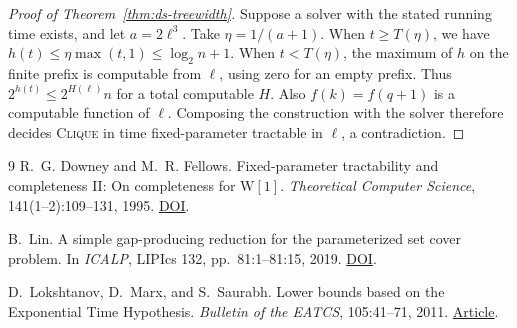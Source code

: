 \documentclass[11pt]{article}
\begin{document}
\begin{proof}[Proof of Theorem~\ref{thm:ds-treewidth}]
Suppose a solver with the stated running time exists, and let
\(a=2\ell^3\). Take \(\eta=1/(a+1)\). When \(t\ge T(\eta)\), we have
\(h(t)\le \eta\max(t,1)\le \log_2 n+1\). When \(t<T(\eta)\), the maximum
of \(h\) on the finite prefix is computable from \(\ell\), using zero for
an empty prefix. Thus \(2^{h(t)}\le 2^{H(\ell)}n\) for a total computable
\(H\). Also \(f(k)=f(q+1)\) is a computable function of \(\ell\). Composing
the construction with the solver therefore decides \textsc{Clique} in
time fixed-parameter tractable in \(\ell\), a contradiction.
\end{proof}

\begin{thebibliography}{9}
R.~G. Downey and M.~R. Fellows.
Fixed-parameter tractability and completeness II: On completeness for \(\mathrm{W}[1]\).
\emph{Theoretical Computer Science}, 141(1--2):109--131, 1995.
\href{https://doi.org/10.1016/0304-3975(94)00097-3}{DOI}.

B.~Lin.
A simple gap-producing reduction for the parameterized set cover problem.
In \emph{ICALP}, LIPIcs 132, pp.~81:1--81:15, 2019.
\href{https://doi.org/10.4230/LIPIcs.ICALP.2019.81}{DOI}.

D.~Lokshtanov, D.~Marx, and S.~Saurabh.
Lower bounds based on the Exponential Time Hypothesis.
\emph{Bulletin of the EATCS}, 105:41--71, 2011.
\href{https://bulletin.eatcs.org/index.php/beatcs/article/view/92}{Article}.
\end{thebibliography}
\end{document}
